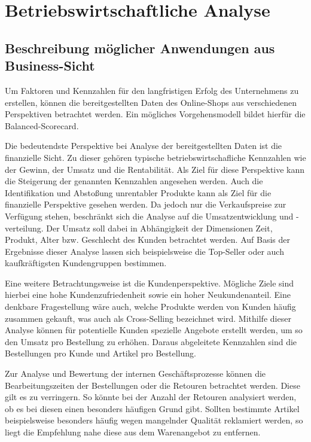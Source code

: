 \section{Betriebswirtschaftliche Analyse}
\subsection{Beschreibung möglicher Anwendungen aus Business-Sicht}

Um Faktoren und Kennzahlen für den langfristigen Erfolg des Unternehmens zu erstellen, können die bereitgestellten Daten des Online-Shops aus verschiedenen Perspektiven betrachtet werden. Ein mögliches Vorgehensmodell bildet hierfür die Balanced-Scorecard.

Die bedeutendste Perspektive bei Analyse der bereitgestellten Daten ist die finanzielle Sicht. Zu dieser gehören typische betriebswirtschafliche Kennzahlen wie der Gewinn, der Umsatz und die Rentabilität. Als Ziel für diese Perspektive kann die Steigerung der genannten Kennzahlen angesehen werden. Auch die Identifikation und Abstoßung unrentabler Produkte kann als Ziel für die finanzielle Perspektive gesehen werden. Da jedoch nur die Verkaufspreise zur Verfügung stehen, beschränkt sich die Analyse auf die Umsatzentwicklung und -verteilung. Der Umsatz soll dabei in Abhängigkeit der Dimensionen Zeit, Produkt, Alter bzw. Geschlecht des Kunden betrachtet werden. Auf Basis der Ergebnisse dieser Analyse lassen sich beispielsweise die Top-Seller oder auch kaufkräftigsten Kundengruppen bestimmen.

Eine weitere Betrachtungsweise ist die Kundenperspektive. Mögliche Ziele sind hierbei eine hohe Kundenzufriedenheit sowie ein hoher Neukundenanteil. Eine denkbare Fragestellung wäre auch, welche Produkte werden von Kunden häufig zusammen gekauft, was auch als Cross-Selling bezeichnet wird. Mithilfe dieser Analyse können für potentielle Kunden spezielle Angebote erstellt werden, um so den Umsatz pro Bestellung zu erhöhen. Daraus abgeleitete Kennzahlen sind die Bestellungen pro Kunde und Artikel pro Bestellung.

Zur Analyse und Bewertung der internen Geschäftsprozesse können die Bearbeitungszeiten der Bestellungen oder die Retouren betrachtet werden. Diese gilt es zu verringern.
So könnte bei der Anzahl der Retouren analysiert werden, ob es bei diesen einen besonders häufigen Grund gibt. Sollten bestimmte Artikel beispielsweise besonders häufig wegen mangelnder Qualität reklamiert werden, so liegt die Empfehlung nahe diese aus dem Warenangebot zu entfernen.

